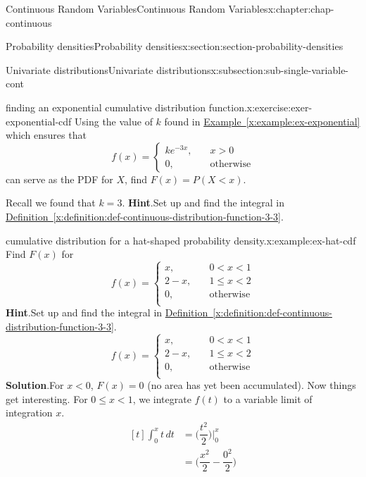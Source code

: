 \documentclass[oneside,10pt,]{book}
\newcommand{\blocktitlefont}{\relax}
\newcommand{\xreffont}{\relax}
\newcommand{\lt}{<}
\newcommand{\gt}{>}
\newcommand{\amp}{&}
\begin{document}
\begin{chapterptx}{Continuous Random Variables}{}{Continuous Random Variables}{}{}{x:chapter:chap-continuous}
\begin{sectionptx}{Probability densities}{}{Probability densities}{}{}{x:section:section-probability-densities}
\begin{subsectionptx}{Univariate distributions}{}{Univariate distributions}{}{}{x:subsection:sub-single-variable-cont}
\begin{inlineexercise}{finding an exponential cumulative distribution function.}{x:exercise:exer-exponential-cdf}
Using the value of \(k\) found in \hyperref[x:example:ex-exponential]{Example~{\xreffont\ref{x:example:ex-exponential}}} which ensures that%
\begin{equation*}
f(x) = \begin{cases}ke^{-3x},\amp \quad x \gt 0\\
0,
\amp \quad \text{otherwise}\end{cases}
\end{equation*}
can serve as the PDF for \(X\), find \(F(x) = P(X \lt x)\).%
\par
Recall we found that \(k=3\).%
\textbf{\blocktitlefont Hint}.\quad{}Set up and find the integral in \hyperref[x:definition:def-continuous-distribution-function-3-3]{Definition~{\xreffont\ref{x:definition:def-continuous-distribution-function-3-3}}}.%
\end{inlineexercise}
\begin{example}{cumulative distribution for a hat-shaped probability density.}{x:example:ex-hat-cdf}%
Find \(F(x)\) for%
\begin{equation*}
f(x) = \begin{cases}x,
\amp \quad 0 \lt x \lt 1\\
2-x, \amp \quad 1 \le x \lt 2\\
0, \amp \quad \text{otherwise}\\
\end{cases}
\end{equation*}
%
\textbf{\blocktitlefont Hint}.\quad{}Set up and find the integral in \hyperref[x:definition:def-continuous-distribution-function-3-3]{Definition~{\xreffont\ref{x:definition:def-continuous-distribution-function-3-3}}}.%
\begin{equation*}
f(x) = \begin{cases}
x, \amp \quad 0 \lt x \lt 1\\
2-x, \amp \quad 1 \le x \lt 2\\
0, \amp \quad \text{otherwise}\\
\end{cases}
\end{equation*}
%
\textbf{\blocktitlefont Solution}.\quad{}For \(x \lt 0\), \(F(x) = 0\) (no area has yet been accumulated). Now things get interesting.  For \(0 \le x \lt 1\), we integrate \(f(t)\) to a variable limit of integration \(x\).%
\begin{equation*}
\begin{aligned}[t]
\int_0^x t\,dt \amp = \Big(\dfrac{t^2}{2}\Big)\Big|_0^x\\
\amp = \Big(\dfrac{x^2}{2} - \dfrac{0^2}{2}\Big)\\

\end{aligned}
\end{equation*}
\end{example}
\end{subsectionptx}
\end{sectionptx}
\end{chapterptx}
\end{document}
